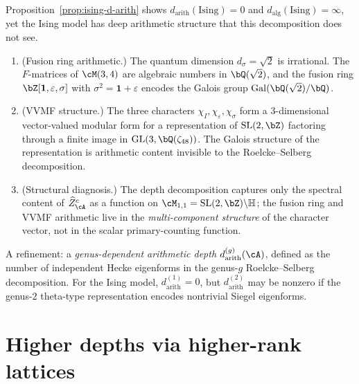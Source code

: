 \begin{remark}%
\label{rem:ising-arithmetic-paradox}%
\ClaimStatusProvedHere%
%
%
%
Proposition~\ref{prop:ising-d-arith} shows $d_{\mathrm{arith}}(\mathrm{Ising}) = 0$
and $d_{\mathrm{alg}}(\mathrm{Ising}) = \infty$, yet the Ising model
has deep arithmetic structure that this decomposition
does not see.

\begin{enumerate}[label=\textup{(\roman*)}]
\item \textup{(Fusion ring arithmetic.)}
The quantum dimension $d_\sigma = \sqrt{2}$ is irrational.
The $F$-matrices of $\cM(3,4)$ are algebraic numbers in
$\bQ(\sqrt{2})$, and the fusion ring
$\bZ[\mathbf{1}, \varepsilon, \sigma]$ with
$\sigma^2 = \mathbf{1} + \varepsilon$ encodes the
Galois group $\mathrm{Gal}(\bQ(\sqrt{2})/\bQ)$.

\item \textup{(VVMF structure.)}
The three characters $\chi_I, \chi_\varepsilon, \chi_\sigma$ form
a $3$-dimensional vector-valued modular form for a
representation of $\mathrm{SL}(2,\bZ)$ factoring through a
finite image in $\mathrm{GL}(3, \bQ(\zeta_{48}))$.
The Galois structure of the representation is
arithmetic content invisible to the Roelcke--Selberg
decomposition.

\item \textup{(Structural diagnosis.)}
The depth decomposition captures only the spectral content
of $\widehat{Z}^c_\cA$ as a function on
$\cM_{1,1} = \mathrm{SL}(2,\bZ)\backslash\mathbb{H}$;
the fusion ring and VVMF arithmetic live in the
\emph{multi-component structure} of the character vector,
not in the scalar primary-counting function.
\end{enumerate}
A refinement:
a \emph{genus-dependent arithmetic depth}
$d_{\mathrm{arith}}^{(g)}(\cA)$, defined as the number of
independent Hecke eigenforms in the genus-$g$
Roelcke--Selberg decomposition. For the Ising model,
$d_{\mathrm{arith}}^{(1)} = 0$, but
$d_{\mathrm{arith}}^{(2)}$ may be nonzero if the genus-$2$
theta-type representation encodes nontrivial Siegel eigenforms.
\end{remark}

\section{Higher depths via higher-rank lattices}
\label{sec:higher-depths}

